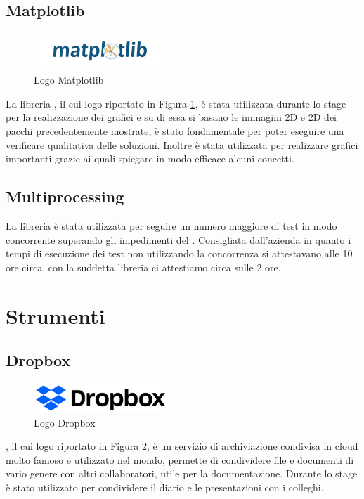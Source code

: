 \subsection{Matplotlib}
\begin{figure}[H]
	\begin{center} \includegraphics[width=5cm]{figures/matplotlib-1}
		\caption[Logo Matplotlib]{Logo Matplotlib}
		\label{logo_matplotlib} 
	\end{center}
\end{figure}
La libreria , il cui logo riportato in Figura \ref{logo_matplotlib}, è stata utilizzata durante lo stage per la realizzazione dei grafici e su di essa si basano le immagini 2D e 2D dei pacchi precedentemente mostrate, è stato fondamentale per poter eseguire una verificare qualitativa delle soluzioni. Inoltre è stata utilizzata per realizzare grafici importanti grazie ai quali spiegare in modo efficace alcuni concetti.

\subsection{Multiprocessing}
La libreria  è stata utilizzata per seguire un numero maggiore di test in modo concorrente superando gli impedimenti del . Consigliata dall'azienda in quanto i tempi di esecuzione dei test non utilizzando la concorrenza si attestavano alle 10 ore circa, con la suddetta libreria ci attestiamo circa sulle 2 ore.

\section{Strumenti}
\subsection{Dropbox}
\begin{figure}[H]
	\begin{center} \includegraphics[width=5cm]{figures/dropbox_2017_logo}
		\caption[Logo Dropbox]{Logo Dropbox}  
		\label{logo_dropbox} 
	\end{center}
\end{figure}
, il cui logo riportato in Figura \ref{logo_dropbox}, è un servizio di archiviazione condivisa in cloud molto famoso e utilizzato nel mondo, permette di condividere file e documenti di vario genere con altri collaboratori, utile per la documentazione. Durante lo stage è stato utilizzato per condividere il diario e le presentazioni con i colleghi.

